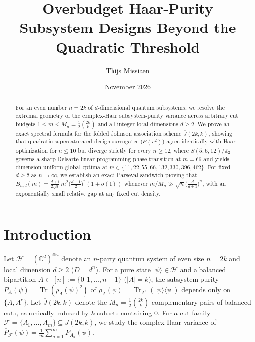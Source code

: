 \documentclass[11pt,reqno]{amsart}
\title[Overbudget Haar-Purity Subsystem Designs]{Overbudget Haar-Purity Subsystem Designs Beyond the Quadratic Threshold}
\author{Thijs Missiaen}
\date{November 2026}
\theoremstyle{definition}
\theoremstyle{remark}
\newcommand{\Tr}{\operatorname{Tr}}
\newcommand{\Jbar}{\overline{J}}
\newcommand{\F}{\mathcal{F}}
\begin{document}
\begin{abstract}
For an even number $n = 2k$ of $d$-dimensional quantum subsystems, we resolve the extremal geometry of the complex-Haar subsystem-purity variance across arbitrary cut budgets $1 \le m \le M_n = \frac{1}{2}\binom{2k}{k}$ and all integer local dimensions $d \ge 2$.
We prove an exact spectral formula for the folded Johnson association scheme $\Jbar(2k,k)$, showing that quadratic supersaturated-design surrogates ($E(s^2)$) agree identically with Haar optimization for $n \le 10$ but diverge strictly for every $n \ge 12$, where $S(5,6,12)/\mathbb{Z}_2$ governs a sharp Delsarte linear-programming phase transition at $m=66$ and yields dimension-uniform global optima at $m \in \{11,22,55,66,132,330,396,462\}$.
For fixed $d \ge 2$ as $n \to \infty$, we establish an exact Parseval sandwich proving that $B_{n,d}(m) = \frac{d+1}{2\sqrt{d}}\,m^2\bigl(\frac{d+1}{2}\bigr)^n(1+o(1))$ whenever $m/M_n \gg \sqrt{n}\bigl(\frac{d}{d+1}\bigr)^n$, with an exponentially small relative gap at any fixed cut density.
\end{abstract}

\maketitle

\section{Introduction}

Let $\mathcal{H} = (\mathbb{C}^d)^{\otimes n}$ denote an $n$-party quantum system of even size $n = 2k$ and local dimension $d \ge 2$ ($D = d^n$). For a pure state $|\psi\rangle \in \mathcal{H}$ and a balanced bipartition $A \subset [n] := \{0,1,\dots,n-1\}$ ($|A|=k$), the subsystem purity $P_A(\psi) = \Tr(\rho_A(\psi)^2)$ of $\rho_A(\psi) = \Tr_{A^c}(|\psi\rangle\langle\psi|)$ depends only on $\{A, A^c\}$. Let $\Jbar(2k,k)$ denote the $M_n = \frac{1}{2}\binom{2k}{k}$ complementary pairs of balanced cuts, canonically indexed by $k$-subsets containing $0$. For a cut family $\F = \{A_1,\dots,A_m\} \subseteq \Jbar(2k,k)$, we study the complex-Haar variance of $\overline{P}_{\F}(\psi) = \frac{1}{m}\sum_{a=1}^m P_{A_a}(\psi)$.
\end{document}
